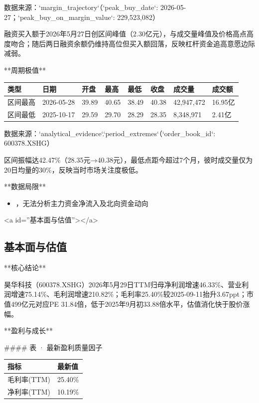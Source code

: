 \documentclass[12pt,a4paper]{article}
\begin{document}
数据来源：`margin\_trajectory`（`peak\_buy\_date`: 2026-05-27；`peak\_buy\_on\_margin\_value`: 229,523,082）

融资买入额于2026年5月27日创区间峰值（2.30亿元），与成交量峰值及价格高点高度吻合；随后两日融资余额仍维持高位但买入额回落，反映杠杆资金追高意愿边际减弱。

**周期极值**

\begin{table}[htbp]
\centering
\begin{tabular}{llllllll}
\toprule
类型 & 日期 & 开盘 & 最高 & 最低 & 收盘 & 成交量 & 成交额 \\
\midrule
区间最高 & 2026-05-28 & 39.89 & 40.65 & 38.49 & 40.38 & 42,947,472 & 16.95亿 \\
区间最低 & 2025-10-17 & 29.59 & 29.70 & 28.29 & 28.35 & 8,348,971 & 2.41亿 \\
\bottomrule
\end{tabular}
\end{table}


数据来源：`analytical\_evidence`.`period\_extremes`（`order\_book\_id`: 600378.XSHG）

区间振幅达42.47\%（28.35元→40.38元），最低点距今超过7个月，彼时成交量仅为20日均量的30\%，反映当时市场关注度极低。

**数据局限**

\begin{itemize}
\item ，无法分析主力资金净流入及北向资金动向
\end{itemize}

<a id=''基本面与估值''></a>

\subsection{ 基本面与估值}

**核心结论**

昊华科技（600378.XSHG）2026年5月29日TTM归母净利润增速46.33\%、营业利润增速75.14\%、毛利润增速210.82\%；毛利率25.40\%较2025-09-11抬升3.67ppt；市值499亿元对应PE 31.84倍，低于2025年9月初33.88倍水平，估值消化快于股价涨幅。

**盈利与成长**

\#\#\#\# 表 · 最新盈利质量因子

\begin{table}[htbp]
\centering
\begin{tabular}{ll}
\toprule
指标 & 最新值 \\
\midrule
毛利率(TTM) & 25.40\% \\
净利率(TTM) & 10.19\% \\
\bottomrule
\end{tabular}
\end{table}
\end{document}
